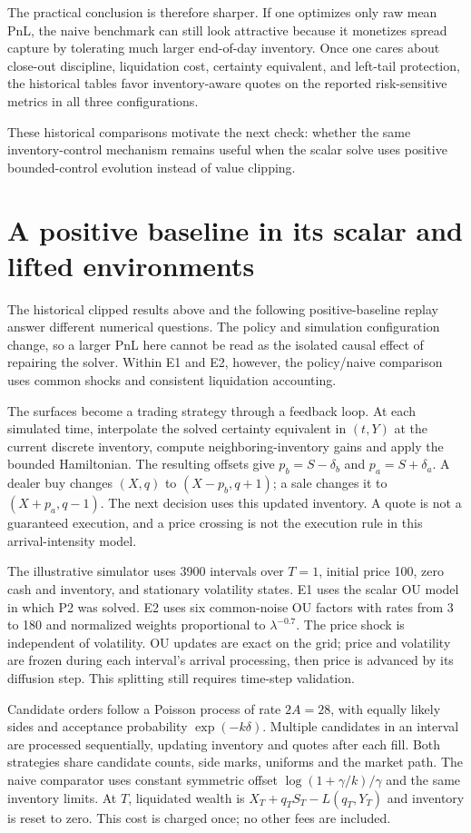 The practical conclusion is therefore sharper. If one optimizes only raw mean PnL, the naive benchmark can still look attractive because it monetizes spread capture by tolerating much larger end-of-day inventory. Once one cares about close-out discipline, liquidation cost, certainty equivalent, and left-tail protection, the historical tables favor inventory-aware quotes on the reported risk-sensitive metrics in all three configurations.

These historical comparisons motivate the next check: whether the same inventory-control mechanism remains useful when the scalar solve uses positive bounded-control evolution instead of value clipping.
\section{A positive baseline in its scalar and lifted environments}
The historical clipped results above and the following positive-baseline replay answer different numerical questions. The policy and simulation configuration change, so a larger PnL here cannot be read as the isolated causal effect of repairing the solver. Within E1 and E2, however, the policy/naive comparison uses common shocks and consistent liquidation accounting.

The surfaces become a trading strategy through a feedback loop. At each simulated time, interpolate the solved certainty equivalent in $(t,Y)$ at the current discrete inventory, compute neighboring-inventory gains and apply the bounded Hamiltonian. The resulting offsets give $p_b=S-\delta_b$ and $p_a=S+\delta_a$. A dealer buy changes $(X,q)$ to $(X-p_b,q+1)$; a sale changes it to $(X+p_a,q-1)$. The next decision uses this updated inventory. A quote is not a guaranteed execution, and a price crossing is not the execution rule in this arrival-intensity model.

The illustrative simulator uses 3900 intervals over $T=1$, initial price 100, zero cash and inventory, and stationary volatility states. E1 uses the scalar OU model in which P2 was solved. E2 uses six common-noise OU factors with rates from 3 to 180 and normalized weights proportional to $\lambda^{-0.7}$. The price shock is independent of volatility. OU updates are exact on the grid; price and volatility are frozen during each interval's arrival processing, then price is advanced by its diffusion step. This splitting still requires time-step validation.

Candidate orders follow a Poisson process of rate $2A=28$, with equally likely sides and acceptance probability $\exp(-k\delta)$. Multiple candidates in an interval are processed sequentially, updating inventory and quotes after each fill. Both strategies share candidate counts, side marks, uniforms and the market path. The naive comparator uses constant symmetric offset $\log(1+\gamma/k)/\gamma$ and the same inventory limits. At $T$, liquidated wealth is $X_T+q_TS_T-L(q_T,Y_T)$ and inventory is reset to zero. This cost is charged once; no other fees are included.

